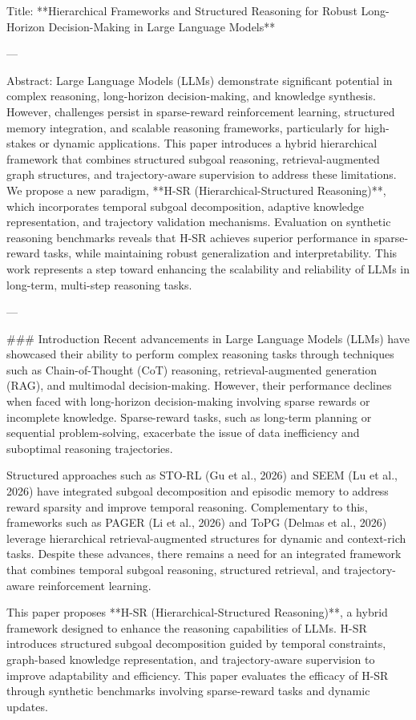 Title: **Hierarchical Frameworks and Structured Reasoning for Robust Long-Horizon Decision-Making in Large Language Models**

---

Abstract:  
Large Language Models (LLMs) demonstrate significant potential in complex reasoning, long-horizon decision-making, and knowledge synthesis. However, challenges persist in sparse-reward reinforcement learning, structured memory integration, and scalable reasoning frameworks, particularly for high-stakes or dynamic applications. This paper introduces a hybrid hierarchical framework that combines structured subgoal reasoning, retrieval-augmented graph structures, and trajectory-aware supervision to address these limitations. We propose a new paradigm, **H-SR (Hierarchical-Structured Reasoning)**, which incorporates temporal subgoal decomposition, adaptive knowledge representation, and trajectory validation mechanisms. Evaluation on synthetic reasoning benchmarks reveals that H-SR achieves superior performance in sparse-reward tasks, while maintaining robust generalization and interpretability. This work represents a step toward enhancing the scalability and reliability of LLMs in long-term, multi-step reasoning tasks.

---

### Introduction  
Recent advancements in Large Language Models (LLMs) have showcased their ability to perform complex reasoning tasks through techniques such as Chain-of-Thought (CoT) reasoning, retrieval-augmented generation (RAG), and multimodal decision-making. However, their performance declines when faced with long-horizon decision-making involving sparse rewards or incomplete knowledge. Sparse-reward tasks, such as long-term planning or sequential problem-solving, exacerbate the issue of data inefficiency and suboptimal reasoning trajectories.

Structured approaches such as STO-RL (Gu et al., 2026) and SEEM (Lu et al., 2026) have integrated subgoal decomposition and episodic memory to address reward sparsity and improve temporal reasoning. Complementary to this, frameworks such as PAGER (Li et al., 2026) and ToPG (Delmas et al., 2026) leverage hierarchical retrieval-augmented structures for dynamic and context-rich tasks. Despite these advances, there remains a need for an integrated framework that combines temporal subgoal reasoning, structured retrieval, and trajectory-aware reinforcement learning.

This paper proposes **H-SR (Hierarchical-Structured Reasoning)**, a hybrid framework designed to enhance the reasoning capabilities of LLMs. H-SR introduces structured subgoal decomposition guided by temporal constraints, graph-based knowledge representation, and trajectory-aware supervision to improve adaptability and efficiency. This paper evaluates the efficacy of H-SR through synthetic benchmarks involving sparse-reward tasks and dynamic updates.

